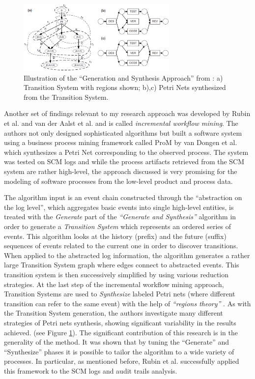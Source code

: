 \documentclass{sig-alternate}
\begin{document}
\begin{figure}[tbp]
   \centering
   \includegraphics[height=36mm]{petri.eps}
   \caption{Illustration of the ``Generation and Synthesis Approach'' from \cite{citeulike:5043673}: a) Transition System with regions shown; b),c) Petri Nets synthesized from the Transition System.}
   \label{fig:petri}
\end{figure}

Another set of findings relevant to my research approach was developed by Rubin et al. \cite{citeulike:1885717} and van der Aalst et al. \cite{citeulike:3718014} and is called \textit{incremental workflow mining}. The authors not only designed sophisticated algorithms but built a software system using a business process mining framework called ProM by van Dongen et al. \cite{citeulike:5043673} which synthesizes a Petri Net corresponding to the observed process. The system was tested on SCM logs and while the process artifacts retrieved from the SCM system are rather high-level, the approach discussed is very promising for the modeling of software processes from the low-level product and process data.

The algorithm input is an event chain constructed through the ``abstraction on the log level'', which aggregates basic events into single high-level entities, is treated with the \textit{Generate} part of the \textit{``Generate and Synthesis''} \cite{citeulike:3718014} algorithm in order to generate a \textit{Transition System} which represents an ordered series of events. This algorithm looks at the history (prefix) and the future (suffix) sequences of events related to the current one in order to discover transitions.  When applied to the abstracted log information, the algorithm generates a rather large Transition System graph where edges connect to abstracted events. This transition system is then successively simplified by using various reduction strategies. At the last step of the incremental workflow mining approach, Transition Systems are used to \textit{Synthesize} labeled Petri nets (where different transition can refer to the same event) with the help of \textit{``regions theory''} \cite{citeulike:5128170}. As with the Transition System generation, the authors investigate many different strategies of Petri nets synthesis, showing significant variability in the results achieved. (see Figure \ref{fig:petri}). The significant contribution of this research is in the generality of the method. It was shown that by tuning the ``Generate'' and ``Synthesize'' phases it is possible to tailor the algorithm to a wide variety of processes. In particular, as mentioned before, Rubin et al. successfully applied this framework to the SCM logs and audit trails analysis.
\end{document}

